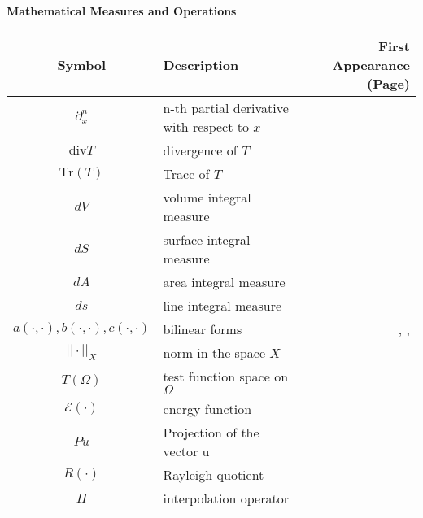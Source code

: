 \documentclass[main.tex]{subfiles}
\begin{document}
\noindent
\textbf{Mathematical Measures and Operations}\\
\begin{tabularx}{\textwidth}{cXr}
\toprule
Symbol & Description & First Appearance (Page) \\ 
\midrule
\( \partial_x^n \) & n-th partial derivative with respect to \( x \) & \pageref{sym:partial_diff} \\
\( \textrm{div} T \) & divergence of \( T \) & \pageref{sym:divT} \\
\( \textrm{Tr}(T) \) & Trace of \( T \) & \pageref{sym:TrT} \\
\( dV \) & volume integral measure & \pageref{sym:dV} \\
\( dS \) & surface integral measure & \pageref{sym:dS} \\
\( dA \) & area integral measure & \pageref{sym:dA} \\
\( ds \) & line integral measure & \pageref{sym:ds} \\
\( a(\cdot,\cdot), b(\cdot,\cdot), c(\cdot,\cdot) \) & bilinear forms & \pageref{sym:a}, \pageref{sym:b}, \pageref{sym:c} \\
\( ||\cdot||_X \) & norm in the space \( X \) & \pageref{sym:norm} \\
\( T(\Omega) \) & test function space on \( \Omega \) & \pageref{sym:TOmega} \\
\( \mathcal{E}(\cdot) \) & energy function & \pageref{sym:Energy} \\
\( Pu \) & Projection of the vector u & \pageref{sym:Pu} \\
\( R(\cdot) \) & Rayleigh quotient & \pageref{sym:Rayleigh} \\
\( \Pi \) & interpolation operator & \pageref{sym:interpolation} \\

\bottomrule
\end{tabularx}
\end{document}
